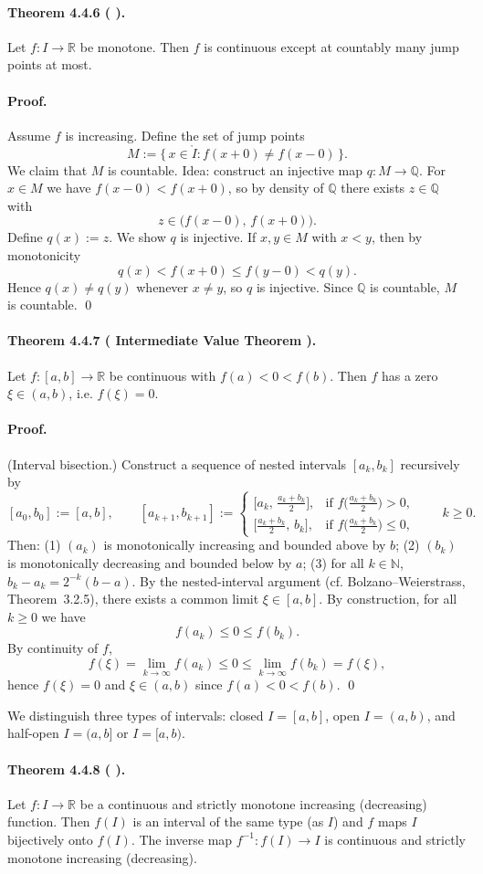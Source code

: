\documentclass[12pt]{article}
\newcommand{\N}{\mathbb{N}}
\newcommand{\Q}{\mathbb{Q}}
\newcommand{\R}{\mathbb{R}}
\newcommand{\NumberedTheorem}[3]{%
\paragraph*{Theorem #1 ( #2 ).} #3\par}
\begin{document}
\NumberedTheorem{4.4.6}{}{Let $f:I\to\R$ be monotone. Then $f$ is continuous except at countably many jump points at most.}
\paragraph{Proof.} Assume $f$ is increasing. Define the set of jump points
\[
	M := \{\, x\in \mathring I : f(x+0)\ne f(x-0)\,\}.
\]
We claim that $M$ is countable. Idea: construct an injective map $q:M\to\Q$. For $x\in M$ we have $f(x-0)<f(x+0)$, so by density of $\Q$ there exists $z\in\Q$ with
\[
	z\in\bigl( f(x-0),\, f(x+0) \bigr).
\]
Define $q(x):=z$. We show $q$ is injective. If $x,y\in M$ with $x<y$, then by monotonicity
\[
	q(x) < f(x+0) \le f(y-0) < q(y).
\]
Hence $q(x)\ne q(y)$ whenever $x\ne y$, so $q$ is injective. Since $\Q$ is countable, $M$ is countable. \qed

\NumberedTheorem{4.4.7}{Intermediate Value Theorem}{Let $f:[a,b]\to\R$ be continuous with $f(a)<0<f(b)$. Then $f$ has a zero $\xi\in(a,b)$, i.e. $f(\xi)=0$.}
\paragraph{Proof.} (Interval bisection.) Construct a sequence of nested intervals $[a_k,b_k]$ recursively by
\[
	[a_0,b_0]:=[a,b], \qquad
	[a_{k+1},b_{k+1}]:=
	\begin{cases}
		\bigl[a_k,\, \tfrac{a_k+b_k}{2}\bigr], & \text{if } f\bigl( \tfrac{a_k+b_k}{2} \bigr) > 0,\\[0.4em]
		\bigl[ \tfrac{a_k+b_k}{2},\, b_k \bigr], & \text{if } f\bigl( \tfrac{a_k+b_k}{2} \bigr) \le 0,
	\end{cases}
	\qquad k\ge 0.
\]
Then: (1) $(a_k)$ is monotonically increasing and bounded above by $b$; (2) $(b_k)$ is monotonically decreasing and bounded below by $a$; (3) for all $k\in\N$, $b_k-a_k=2^{-k}(b-a)$. By the nested-interval argument (cf. Bolzano–Weierstrass, Theorem~3.2.5), there exists a common limit $\xi\in[a,b]$. By construction, for all $k\ge0$ we have
\[
	f(a_k) \le 0 \le f(b_k).
\]
By continuity of $f$,
\[
	f(\xi) = \lim_{k\to\infty} f(a_k) \le 0 \le \lim_{k\to\infty} f(b_k) = f(\xi),
\]
hence $f(\xi)=0$ and $\xi\in(a,b)$ since $f(a)<0<f(b)$. \qed


\vspace{1cm}

We distinguish three types of intervals: closed $I=[a,b]$, open $I=(a,b)$, and half-open $I=(a,b]$ or $I=[a,b)$.

\NumberedTheorem{4.4.8}{}{Let $f:I\to\R$ be a continuous and strictly monotone increasing (decreasing) function. Then $f(I)$ is an interval of the same type (as $I$) and $f$ maps $I$ bijectively onto $f(I)$. The inverse map $f^{-1}:f(I)\to I$ is continuous and strictly monotone increasing (decreasing).}
\end{document}
